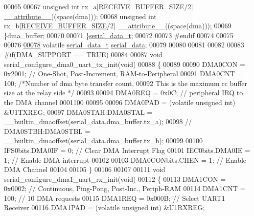 \begin{DoxyCode}
00065 
00067         \textcolor{keywordtype}{unsigned} \textcolor{keywordtype}{int} rx\_a[\hyperlink{a00031_aa49ab378520c95fea987f93a7f3c9abf}{RECEIVE\_BUFFER\_SIZE}/2] 
      \hyperlink{a00030_a2068c3c2584547dbc1c8b9bca2d55b18}{\_\_attribute\_\_}((space(dma)));
00068         \textcolor{keywordtype}{unsigned} \textcolor{keywordtype}{int} rx\_b[\hyperlink{a00031_aa49ab378520c95fea987f93a7f3c9abf}{RECEIVE\_BUFFER\_SIZE}/2] 
      \hyperlink{a00030_a2068c3c2584547dbc1c8b9bca2d55b18}{\_\_attribute\_\_}((space(dma)));
00069         \}dma\_buffer;
00070 
00071 \}\hyperlink{a00030_d8/db4/a00760}{serial\_data\_t};
00072 
00073 \textcolor{preprocessor}{#endif}
00074 
00075 
00076 
\hypertarget{a00030_source_l00078}{}\hyperlink{a00030_a77d3b77ccd59a0065642bf1ac7887b9d}{00078} \textcolor{keyword}{volatile} \hyperlink{a00030_d8/db4/a00760}{serial\_data\_t} \hyperlink{a00030_a77d3b77ccd59a0065642bf1ac7887b9d}{serial\_data};
00079 
00080 
00081 
00082 
00083 \textcolor{preprocessor}{#if(DMA\_SUPPORT == TRUE)}
00084 
00087 \textcolor{keywordtype}{void}   serial\_configure\_dma0\_uart\_tx\_init(\textcolor{keywordtype}{void})
00088 \{
00089 
00090     DMA0CON = 0x2001;               \textcolor{comment}{// One-Shot, Post-Increment, RAM-to-Peripheral}
00091     DMA0CNT = 100;                  \textcolor{comment}{/*Number of dma byte transfer count,}
00092 \textcolor{comment}{                                     This is the maximum rc buffer size at the relay side */}
00093 
00094     DMA0REQ = 0x0C;               \textcolor{comment}{// peripheral IRQ to the DMA channel  0001100}
00095 
00096     DMA0PAD = (\textcolor{keyword}{volatile} \textcolor{keywordtype}{unsigned} int) &U1TXREG;
00097     DMA0STAH:DMA0STAL = \_\_builtin\_dmaoffset(serial\_data.dma\_buffer.tx\_a);
00098    \textcolor{comment}{// DMA0STBH:DMA0STBL = \_\_builtin\_dmaoffset(serial\_data.dma\_buffer.tx\_b);}
00099 
00100     IFS0bits.DMA0IF = 0;            \textcolor{comment}{// Clear DMA Interrupt Flag}
00101     IEC0bits.DMA0IE = 1;            \textcolor{comment}{// Enable DMA interrupt}
00102 
00103     DMA0CONbits.CHEN = 1;           \textcolor{comment}{// Enable DMA Channel}
00104 
00105 \}
00106 
00107 
00111 \textcolor{keywordtype}{void}   serial\_configure\_dma1\_uart\_rx\_init(\textcolor{keywordtype}{void})
00112 \{
00113 DMA1CON = 0x0002;                   \textcolor{comment}{// Continuous, Ping-Pong, Post-Inc., Periph-RAM}
00114 DMA1CNT = 100;                      \textcolor{comment}{// 10 DMA requests}
00115 DMA1REQ = 0x000B;                   \textcolor{comment}{// Select UART1 Receiver}
00116 DMA1PAD = (\textcolor{keyword}{volatile} \textcolor{keywordtype}{unsigned} int) &U1RXREG;

\end{DoxyCode}

